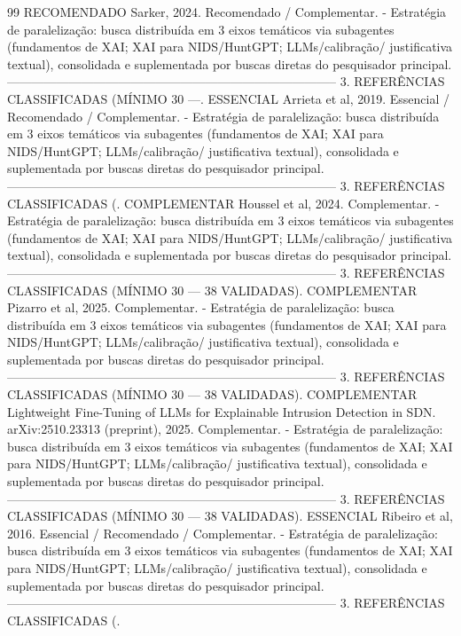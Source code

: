 \documentclass[12pt,a4paper]{article}
\begin{document}
\begin{thebibliography}{99}
 RECOMENDADO Sarker, 2024. Recomendado / Complementar. - Estratégia de paralelização: busca distribuída em 3 eixos temáticos via subagentes (fundamentos de XAI; XAI para NIDS/HuntGPT; LLMs/calibração/ justificativa textual), consolidada e suplementada por buscas diretas do pesquisador principal. -------------------------------------------------------------------------------- 3. REFERÊNCIAS CLASSIFICADAS (MÍNIMO 30 —.
 ESSENCIAL Arrieta et al, 2019. Essencial / Recomendado / Complementar. - Estratégia de paralelização: busca distribuída em 3 eixos temáticos via subagentes (fundamentos de XAI; XAI para NIDS/HuntGPT; LLMs/calibração/ justificativa textual), consolidada e suplementada por buscas diretas do pesquisador principal. -------------------------------------------------------------------------------- 3. REFERÊNCIAS CLASSIFICADAS (.
 COMPLEMENTAR Houssel et al, 2024. Complementar. - Estratégia de paralelização: busca distribuída em 3 eixos temáticos via subagentes (fundamentos de XAI; XAI para NIDS/HuntGPT; LLMs/calibração/ justificativa textual), consolidada e suplementada por buscas diretas do pesquisador principal. -------------------------------------------------------------------------------- 3. REFERÊNCIAS CLASSIFICADAS (MÍNIMO 30 — 38 VALIDADAS).
 COMPLEMENTAR Pizarro et al, 2025. Complementar. - Estratégia de paralelização: busca distribuída em 3 eixos temáticos via subagentes (fundamentos de XAI; XAI para NIDS/HuntGPT; LLMs/calibração/ justificativa textual), consolidada e suplementada por buscas diretas do pesquisador principal. -------------------------------------------------------------------------------- 3. REFERÊNCIAS CLASSIFICADAS (MÍNIMO 30 — 38 VALIDADAS).
 COMPLEMENTAR Lightweight Fine-Tuning of LLMs for Explainable Intrusion Detection in SDN. arXiv:2510.23313 (preprint), 2025. Complementar. - Estratégia de paralelização: busca distribuída em 3 eixos temáticos via subagentes (fundamentos de XAI; XAI para NIDS/HuntGPT; LLMs/calibração/ justificativa textual), consolidada e suplementada por buscas diretas do pesquisador principal. -------------------------------------------------------------------------------- 3. REFERÊNCIAS CLASSIFICADAS (MÍNIMO 30 — 38 VALIDADAS).
 ESSENCIAL Ribeiro et al, 2016. Essencial / Recomendado / Complementar. - Estratégia de paralelização: busca distribuída em 3 eixos temáticos via subagentes (fundamentos de XAI; XAI para NIDS/HuntGPT; LLMs/calibração/ justificativa textual), consolidada e suplementada por buscas diretas do pesquisador principal. -------------------------------------------------------------------------------- 3. REFERÊNCIAS CLASSIFICADAS (.

\end{thebibliography}
\end{document}
